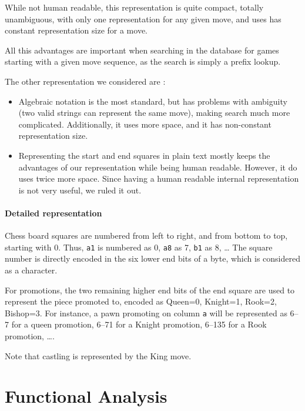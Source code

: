 \documentclass{article}
\begin{document}
While not human readable, this representation is quite compact, totally unambiguous,
with only one representation for any given move, and uses has constant representation
size for a move.

All this advantages are important when searching in the database for games starting
with a given move sequence, as the search is simply a prefix lookup.

The other representation we considered are :
\begin{itemize}
\item Algebraic notation is the most standard, but has problems with ambiguity
(two valid strings can represent the same move), making search much more complicated.
Additionally, it uses more space, and it has non-constant representation size.

\item Representing the start and end squares in plain text mostly keeps the advantages
of our representation while being human readable. However, it do uses twice more space.
Since having a human readable internal representation is not very useful,
we ruled it out.
\end{itemize}


\paragraph{Detailed representation}
Chess board squares are numbered from left to right, and from bottom to top,
starting with 0. Thus, \verb|a1| is numbered as 0, \verb|a8| as 7, \verb|b1| as 8, \dots
The square number is directly encoded in the six lower end bits of a byte, which is considered as a character.

For promotions, the two remaining higher end bits of the end square are used to represent the piece promoted to,
encoded as Queen=0, Knight=1, Rook=2, Bishop=3.
For instance, a pawn promoting on column \verb|a| will be represented as 6--7 for a queen promotion,
6--71 for a Knight promotion, 6--135 for a Rook promotion, \dots.

Note that castling is represented by the King move.


\section{Functional Analysis}
\end{document}
